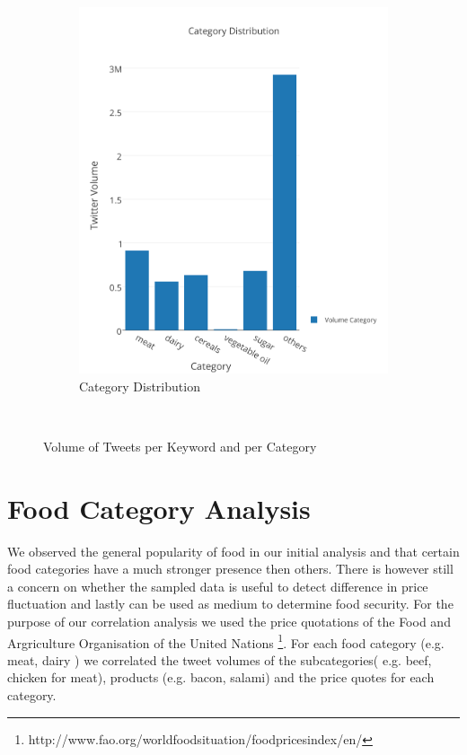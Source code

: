 \begin{figure}[H]
\begin{subfigure}[b]{0.5\textwidth}
                \includegraphics[width=\textwidth]{img/anal/exp_dist_cat}
                \caption{Category Distribution}
                \label{fig:cat}
        \end{subfigure}
        ~ %
      
        \caption{Volume of Tweets per Keyword and per Category}\label{fig:distribution}
\end{figure}


\section{Food  Category Analysis}


We observed the general popularity of food in our initial analysis and that certain food categories have a much stronger presence then others. There is however still a concern on whether the sampled data is useful to detect difference in price fluctuation and lastly can  be used as medium to determine food security. For the purpose of our correlation analysis we used the price quotations of the Food and Argriculture Organisation of the United Nations \footnote{http://www.fao.org/worldfoodsituation/foodpricesindex/en/}. For each food category (e.g. meat, dairy ) we correlated the tweet volumes of the subcategories( e.g. beef, chicken for meat), products (e.g. bacon, salami) and the price quotes for each category.  

